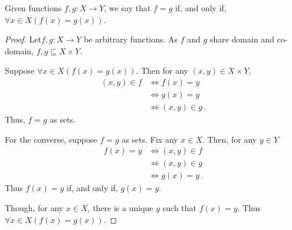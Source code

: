 \guard





\begin{prop}
\label{prop:functionEquality}
  Given functions $f,g:X\to Y$, we say that $f=g$ if, and only if, $\forall x\in X(f(x)=g(x))$.
\end{prop}
\begin{proof}
  Let$f,g:X \to Y$ be arbitrary functions.
  As $f$ and $g$ share domain and co-domain, $f,g\subseteq X\times Y$.

  Suppose $\forall x\in X(f(x) = g(x))$.
  Then for any $(x,y)\in X\times Y$,
  \begin{align*}
    (x,y)\in f  &\iff f(x) = y \\
                &\iff g(x) = y \\
                &\iff (x,y)\in g\,.
  \end{align*}
  Thus, $f=g$ as sets.

  For the converse, suppose $f=g$ as sets.
  Fix any $x\in X$.
  Then, for any $y\in Y$
  \begin{align*}
    f(x)=y  &\iff (x,y)\in f \\
            &\iff (x,y)\in g \\
            &\iff g(x) = y\,.
  \end{align*}
  Thus $f(x)=y$ if, and only if, $g(x) = y$.

  Though, for any $x\in X$, there is a unique $y$ such that $f(x)=y$.
  Thus $\forall x\in X( f(x) = g(x) )$.
\end{proof}
